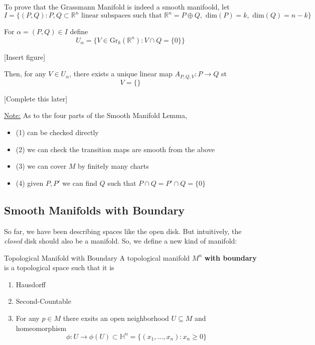 \documentclass{article}
\newcommand{\R}{\mathbb{R}}
\begin{document}
\vskip 1cm  
\begin{dottedbox}
To prove that the Grassmann Manifold is indeed a smooth manifoold, let 
\[ I = \{ (P, Q) : P, Q \subset \R^n \text{ linear subspaces such that } \R^n = P \oplus Q, \text{ dim}(P) = k, \text{ dim}(Q) = n-k \} \]

\vskip 1cm  
For $\alpha = (P, Q) \in I$ define 
\[ U_{\alpha} = \{ V \in \text{Gr}_k(\R^n) : V \cap Q = \{0\} \} \]

\vskip 1cm  
[Insert figure]

\vskip 1cm  
Then, for any $V \in U_{\alpha}$, there exists a unique linear map $A_{P, Q, V} : P \rightarrow Q$ st 
\[ V = \{  \} \]

[Complete this later]
\end{dottedbox}

\vskip 1cm  
\underline{Note:} As to the four parts of the Smooth Manifold Lemma, 
\begin{itemize}
  \item (1) can be checked directly 
  \item (2) we can check the transition maps are smooth from the above
  \item (3) we can cover $M$ by finitely many charts
  \item (4) given $P, P'$ we can find $Q$ such that $P \cap Q = P' \cap Q = \{ 0 \}$ 
\end{itemize}

\vskip 1cm  
\subsection{Smooth Manifolds with Boundary}

So far, we have been describing spaces like the open disk. But intuitively, the \emph{closed} disk should also be a manifold. So, we define a new kind of manifold:

\vskip 0.5cm
\begin{mathdefinitionbox}{Topological Manifold with Boundary}
\vskip 0.5cm
  A topological manifold $M^n$ \textbf{with boundary} is a topological space such that it is
  \begin{enumerate}
    \item Hausdorff
    \item Second-Countable
    \item For any $p \in M$ there exsits an open neighborhood $U \subseteq M$ and homeomorphism 
    \[ \phi : U \rightarrow \phi(U) \subset \mathbb{H}^n = \{(x_1, \dots, x_n) : x_n \geq 0 \}\]
  \end{enumerate}
\end{mathdefinitionbox}
\end{document}
